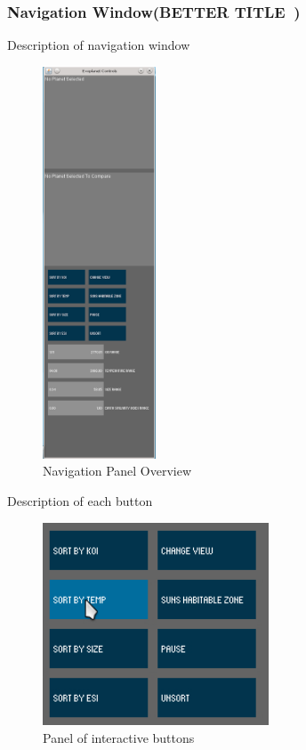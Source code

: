 \subsubsection{Navigation Window(BETTER TITLE~)}
Description of navigation window
\begin{figure}[H]
  \centering
      \includegraphics[width=0.3\textwidth]{images/nav.png}
  \caption{Navigation Panel Overview}
  \label{fig:nav}
\end{figure}
Description of each button
\begin{figure}[H]
  \centering
      \includegraphics[width=0.6\textwidth]{images/buttons.jpg}
  \caption{Panel of interactive buttons}
  \label{fig:buttons}
\end{figure}
